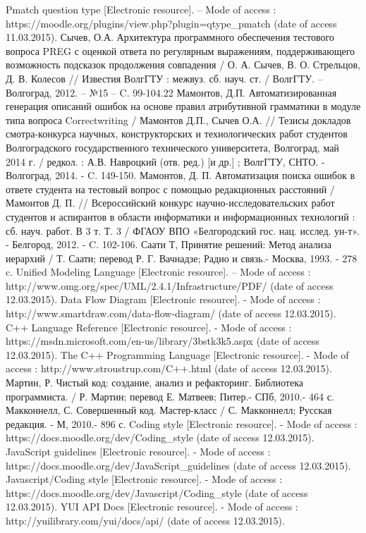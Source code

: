\documentclass[a4paper,english,russian]{G2-105}
\begin{document}
\begin{thebibliography}{1}
     Pmatch question type [Electronic resource]. – Mode of access : https://moodle.org/plugins/view.php?plugin=qtype\_pmatch (date of access 11.03.2015).
 Сычев, О.А. Архитектура программного обеспечения тестового вопроса PREG с оценкой ответа по регулярным выражениям, поддерживающего возможность подсказок продолжения совпадения / О. А. Сычев, В. О. Стрельцов, Д. В. Колесов // Известия ВолгГТУ : межвуз. сб. науч. ст. / ВолгГТУ. – Волгоград, 2012. – №15 – C. 99-104.22
 Мамонтов, Д.П. Автоматизированная генерация описаний ошибок на основе правил атрибутивной грамматики в модуле типа вопроса Correctwriting / Мамонтов Д.П., Сычев О.А. // Тезисы докладов смотра-конкурса научных, конструкторских и технологических работ студентов Волгоградского государственного технического университета, Волгоград, май 2014 г. / редкол. : А.В. Навроцкий (отв. ред.) [и др.] ; ВолгГТУ, СНТО. - Волгоград, 2014. - C. 149-150.
 Мамонтов, Д. П. Автоматизация поиска ошибок в ответе студента на тестовый вопрос с помощью редакционных расстояний / Мамонтов Д. П. // Всероссийский конкурс научно-исследовательских работ студентов и аспирантов в области информатики и информационных технологий : сб. науч. работ. В 3 т. Т. 3 / ФГАОУ ВПО «Белгородский гос. нац. исслед. ун-т». - Белгород, 2012. - C. 102-106.
 Саати Т, Принятие решений: Метод анализа иерархий / Т. Саати; перевод Р. Г. Вачнадзе; Радио и связь.- Москва, 1993. - 278 c.
 Unified Modeling Language [Electronic resource]. – Mode of access : http://www.omg.org/spec/UML/2.4.1/Infrastructure/PDF/ (date of access 12.03.2015).
 Data Flow Diagram [Electronic resource]. - Mode of access : http://www.smartdraw.com/data-flow-diagram/ (date of access 12.03.2015).
 C++ Language Reference [Electronic resource]. - Mode of access : https://msdn.microsoft.com/en-us/library/3bstk3k5.aspx (date of access 12.03.2015).
 The C++ Programming Language [Electronic resource]. - Mode of access : http://www.stroustrup.com/C++.html (date of access 12.03.2015).
 Мартин, Р. Чистый код: создание, анализ и рефакторинг. Библиотека программиста. / Р. Мартин; перевод Е. Матвеев; Питер.- СПб, 2010.- 464 с.
 Макконнелл, С. Совершенный код. Мастер-класс / С. Макконнелл; Русская редакция. - М, 2010.- 896 с.
 Coding style [Electronic resource]. - Mode of access : https://docs.moodle.org/dev/Coding\_style (date of access 12.03.2015).
 JavaScript guidelines [Electronic resource]. - Mode of access : https://docs.moodle.org/dev/JavaScript\_guidelines (date of access 12.03.2015).
 Javascript/Coding style [Electronic resource]. - Mode of access : https://docs.moodle.org/dev/Javascript/Coding\_style (date of access 12.03.2015).
 YUI API Docs [Electronic resource]. - Mode of access : http://yuilibrary.com/yui/docs/api/ (date of access 12.03.2015).
\end{thebibliography}

\end{document}
